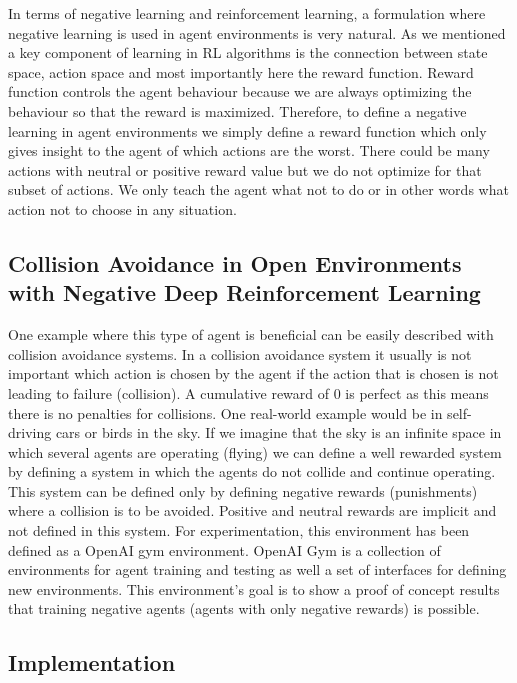 \documentclass[b5paper]{book}
\begin{document}
In terms of negative learning and reinforcement learning, a formulation where negative learning is used in agent environments is very natural. As we mentioned a key component of learning in RL algorithms is the connection between state space, action space and most importantly here the reward function. Reward function controls the agent behaviour because we are always optimizing the behaviour so that the reward is maximized. Therefore, to define a negative learning in agent environments we simply define a reward function which only gives insight to the agent of which actions are the worst. There could be many actions with neutral or positive reward value but we do not optimize for that subset of actions. We only teach the agent what not to do or in other words what action not to choose in any situation.

\subsection{Collision Avoidance in Open Environments with Negative Deep Reinforcement Learning}

One example where this type of agent is beneficial can be easily described with collision avoidance systems. In a collision avoidance system it usually is not important which action is chosen by the agent if the action that is chosen is not leading to failure (collision). A cumulative reward of 0 is perfect as this means there is no penalties for collisions. One real-world example would be in self-driving cars or birds in the sky. If we imagine that the sky is an infinite space in which several agents are operating (flying) we can define a well rewarded system by defining a system in which the agents do not collide and continue operating. This system can be defined only by defining negative rewards (punishments) where a collision is to be avoided. Positive and neutral rewards are implicit and not defined in this system. For experimentation, this environment has been defined as a OpenAI gym environment. OpenAI Gym is a collection of environments for agent training and testing as well a set of interfaces for defining new environments. This environment's goal is to show a proof of concept results that training negative agents (agents with only negative rewards) is possible.

\subsection{Implementation}
\end{document}

